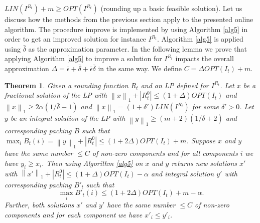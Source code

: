 \documentclass[a4paper,11pt]{article}
\newcommand{\nor}[1]{\left\|#1\right\|}
\newtheorem{thm}{Theorem}
\begin{document}
$\mathit{LIN}(I^{R_t}) +m \geq \mathit{OPT}(I^{R_t})$ (rounding up a basic feasible solution).
Let us discuss how the methods from the previous section apply to the presented online algorithm.
The procedure improve is implemented by using Algorithm \ref{alg5} in order 
to get an improved solution for instance $I^{R_t}$. 
Algorithm \ref{alg5} is applied using $\bar{\delta}$ as the approximation parameter. 
In the following lemma we prove that
applying Algorithm \ref{alg5} to improve a solution for $I^{R_t}$ impacts the overall approximation 
$\Delta = \bar{\epsilon} + \bar{\delta} + \bar{\epsilon} \bar{\delta}$
in the same way. We define $C = \Delta\mathit{OPT}(I_t)+m$.
\begin{thm}\label{thm15}
	Given a rounding function $R_t$ and an LP defined for $I^{R_t}$. Let $x$ be a fractional solution of the LP with
	$\nor{x}_1 + |R_{t}^0|  \leq (1+ \Delta) \mathit{OPT}(I_t)$ and $\nor{x}_1 \geq 2\alpha(1/\bar{\delta} +1)$ 
	and $\nor{x}_1 = (1+\delta')\mathit{LIN}(I^{R_t})$ for some 
	$\delta'>0$. Let $y$ be	an integral solution of the LP with $\nor{y}_1 \geq (m+2)(1/\bar{\delta} +2)$ and
	corresponding packing $B$ such that $\max_i B_t (i) = \nor{y}_1 + |R_{t}^0| \leq (1+ 2\Delta) \mathit{OPT}(I_t)+m$.
	Suppose $x$ and $y$ have the same number $\leq C$ of non-zero components and for all components $i$ we have
	$y_i \geq x_i$.
	Then using 
	Algorithm \ref{alg5} on $x$ and $y$ returns new solutions $x'$ with $\nor{x'}_1 + |R_{t}^0| \leq (1+ \Delta) 
	\mathit{OPT}(I_t) -
	\alpha$ and integral solution $y'$ with corresponding packing $B'_t$ such that
	$$\max_i B'_t (i) \leq (1+ 2 \Delta) \mathit{OPT}(I_t) +m- \alpha.$$
	Further, both solutions $x'$ and $y'$ have the same number $\leq C$ of non-zero components and for each component we have
	$x'_i \leq y'_i$.
\end{thm}
\end{document}
